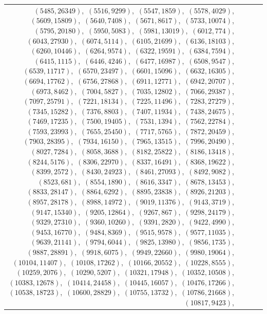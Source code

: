\documentclass[11pt]{article}
\begin{document}
\begin{longtable}{@{}rrl>{\raggedright\arraybackslash}p{}@{}}
$(5485,26349)$,\allowbreak\ $(5516,9299)$,\allowbreak\ $(5547,1859)$,\allowbreak\ $(5578,4029)$,\allowbreak\ $(5609,15809)$,\allowbreak\ $(5640,7408)$,\allowbreak\ $(5671,8617)$,\allowbreak\ $(5733,10074)$,\allowbreak\ $(5795,20180)$,\allowbreak\ $(5950,5083)$,\allowbreak\ $(5981,13019)$,\allowbreak\ $(6012,774)$,\allowbreak\ $(6043,27930)$,\allowbreak\ $(6074,5114)$,\allowbreak\ $(6105,21699)$,\allowbreak\ $(6136,18103)$,\allowbreak\ $(6260,10446)$,\allowbreak\ $(6264,9574)$,\allowbreak\ $(6322,19591)$,\allowbreak\ $(6384,7594)$,\allowbreak\ $(6415,1115)$,\allowbreak\ $(6446,4246)$,\allowbreak\ $(6477,16987)$,\allowbreak\ $(6508,9547)$,\allowbreak\ $(6539,11717)$,\allowbreak\ $(6570,23497)$,\allowbreak\ $(6601,15096)$,\allowbreak\ $(6632,16305)$,\allowbreak\ $(6694,17762)$,\allowbreak\ $(6756,27868)$,\allowbreak\ $(6911,12771)$,\allowbreak\ $(6942,20707)$,\allowbreak\ $(6973,8462)$,\allowbreak\ $(7004,5827)$,\allowbreak\ $(7035,12802)$,\allowbreak\ $(7066,29387)$,\allowbreak\ $(7097,25791)$,\allowbreak\ $(7221,18134)$,\allowbreak\ $(7225,11496)$,\allowbreak\ $(7283,27279)$,\allowbreak\ $(7345,15282)$,\allowbreak\ $(7376,8803)$,\allowbreak\ $(7407,11934)$,\allowbreak\ $(7438,24675)$,\allowbreak\ $(7469,17235)$,\allowbreak\ $(7500,19405)$,\allowbreak\ $(7531,1394)$,\allowbreak\ $(7562,22784)$,\allowbreak\ $(7593,23993)$,\allowbreak\ $(7655,25450)$,\allowbreak\ $(7717,5765)$,\allowbreak\ $(7872,20459)$,\allowbreak\ $(7903,28395)$,\allowbreak\ $(7934,16150)$,\allowbreak\ $(7965,13515)$,\allowbreak\ $(7996,20490)$,\allowbreak\ $(8027,7284)$,\allowbreak\ $(8058,3688)$,\allowbreak\ $(8182,25822)$,\allowbreak\ $(8186,13418)$,\allowbreak\ $(8244,5176)$,\allowbreak\ $(8306,22970)$,\allowbreak\ $(8337,16491)$,\allowbreak\ $(8368,19622)$,\allowbreak\ $(8399,2572)$,\allowbreak\ $(8430,24923)$,\allowbreak\ $(8461,27093)$,\allowbreak\ $(8492,9082)$,\allowbreak\ $(8523,681)$,\allowbreak\ $(8554,1890)$,\allowbreak\ $(8616,3347)$,\allowbreak\ $(8678,13453)$,\allowbreak\ $(8833,28147)$,\allowbreak\ $(8864,6292)$,\allowbreak\ $(8895,23838)$,\allowbreak\ $(8926,21203)$,\allowbreak\ $(8957,28178)$,\allowbreak\ $(8988,14972)$,\allowbreak\ $(9019,11376)$,\allowbreak\ $(9143,3719)$,\allowbreak\ $(9147,15340)$,\allowbreak\ $(9205,12864)$,\allowbreak\ $(9267,867)$,\allowbreak\ $(9298,24179)$,\allowbreak\ $(9329,27310)$,\allowbreak\ $(9360,10260)$,\allowbreak\ $(9391,2820)$,\allowbreak\ $(9422,4990)$,\allowbreak\ $(9453,16770)$,\allowbreak\ $(9484,8369)$,\allowbreak\ $(9515,9578)$,\allowbreak\ $(9577,11035)$,\allowbreak\ $(9639,21141)$,\allowbreak\ $(9794,6044)$,\allowbreak\ $(9825,13980)$,\allowbreak\ $(9856,1735)$,\allowbreak\ $(9887,28891)$,\allowbreak\ $(9918,6075)$,\allowbreak\ $(9949,22660)$,\allowbreak\ $(9980,19064)$,\allowbreak\ $(10104,11407)$,\allowbreak\ $(10108,17262)$,\allowbreak\ $(10166,20552)$,\allowbreak\ $(10228,8555)$,\allowbreak\ $(10259,2076)$,\allowbreak\ $(10290,5207)$,\allowbreak\ $(10321,17948)$,\allowbreak\ $(10352,10508)$,\allowbreak\ $(10383,12678)$,\allowbreak\ $(10414,24458)$,\allowbreak\ $(10445,16057)$,\allowbreak\ $(10476,17266)$,\allowbreak\ $(10538,18723)$,\allowbreak\ $(10600,28829)$,\allowbreak\ $(10755,13732)$,\allowbreak\ $(10786,21668)$,\allowbreak\ $(10817,9423)$,\allowbreak\ 
\end{longtable}
\end{document}
